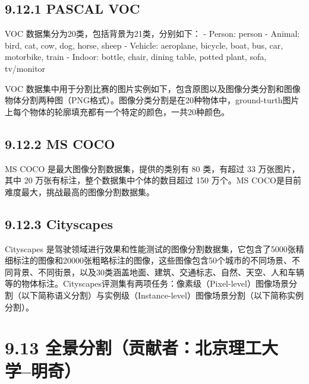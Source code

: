 \subsection{9.12.1 PASCAL VOC}\label{pascal-voc}

VOC 数据集分为20类，包括背景为21类，分别如下： - Person: person -
Animal: bird, cat, cow, dog, horse, sheep - Vehicle: aeroplane, bicycle,
boat, bus, car, motorbike, train - Indoor: bottle, chair, dining table,
potted plant, sofa, tv/monitor

VOC
数据集中用于分割比赛的图片实例如下，包含原图以及图像分类分割和图像物体分割两种图（PNG格式）。图像分类分割是在20种物体中，ground-turth图片上每个物体的轮廓填充都有一个特定的颜色，一共20种颜色。

\begin{figure}
\centering
\end{figure}

\subsection{9.12.2 MS COCO}\label{ms-coco}

MS COCO 是最大图像分割数据集，提供的类别有 80 类，有超过 33
万张图片，其中 20 万张有标注，整个数据集中个体的数目超过 150 万个。MS
COCO是目前难度最大，挑战最高的图像分割数据集。

\begin{figure}
\centering
\end{figure}

\subsection{9.12.3 Cityscapes}\label{cityscapes}

Cityscapes
是驾驶领域进行效果和性能测试的图像分割数据集，它包含了5000张精细标注的图像和20000张粗略标注的图像，这些图像包含50个城市的不同场景、不同背景、不同街景，以及30类涵盖地面、建筑、交通标志、自然、天空、人和车辆等的物体标注。Cityscapes评测集有两项任务：像素级（Pixel-level）图像场景分割（以下简称语义分割）与实例级（Instance-level）图像场景分割（以下简称实例分割）。

\begin{figure}
\centering
\end{figure}

\section{9.13
全景分割（贡献者：北京理工大学--明奇）}\label{ux5168ux666fux5206ux5272ux8d21ux732eux8005ux5317ux4eacux7406ux5de5ux5927ux5b66ux660eux5947}

